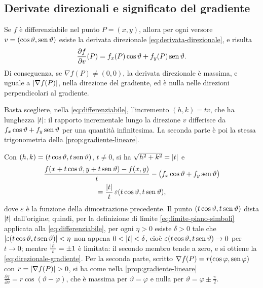 \subsection{Derivate direzionali e significato del gradiente}

\begin{teorema}\label{teo:derivata-direzionale}
Se $f$ è differenziabile nel punto $P=(x,y)$, allora per ogni versore
$v=(\cos\vartheta,\operatorname{sen}\vartheta)$ esiste la derivata direzionale \eqref{eq:derivata-direzionale},
e risulta
\begin{equation}\label{eq:direzionale-gradiente}
  \frac{\partial f}{\partial v}(P)=f_{x}(P)\cos\vartheta+f_{y}(P)\operatorname{sen}\vartheta .
\end{equation}
Di conseguenza, se $\nabla f(P)\neq(0,0)$, la derivata direzionale è massima, e uguale a
$\lvert \nabla f(P)\rvert$, nella direzione del gradiente, ed è nulla nelle direzioni
perpendicolari al gradiente.
\end{teorema}

\begin{schema}
\end{schema}

\begin{strategia}
Basta scegliere, nella \eqref{eq:differenziabile}, l'incremento $(h,k)=tv$, che ha
lunghezza $\lvert t\rvert$: il rapporto incrementale lungo la direzione $v$ differisce da
$f_{x}\cos\vartheta+f_{y}\operatorname{sen}\vartheta$ per una quantità infinitesima. La seconda parte è poi
la stessa trigonometria della \cref{prop:gradiente-lineare}.
\end{strategia}

\begin{dimostrazione}
Con $(h,k)=(t\cos\vartheta,t\operatorname{sen}\vartheta)$, $t\neq0$, si ha $\sqrt{h^{2}+k^{2}}=\lvert t\rvert$ e
\begin{multline*}
  \frac{f(x+t\cos\vartheta,y+t\operatorname{sen}\vartheta)-f(x,y)}{t}-\bigl(f_{x}\cos\vartheta+f_{y}\operatorname{sen}\vartheta\bigr)\\
  =\frac{\lvert t\rvert}{t}\,\varepsilon(t\cos\vartheta,t\operatorname{sen}\vartheta),
\end{multline*}
dove $\varepsilon$ è la funzione della dimostrazione precedente. Il punto
$(t\cos\vartheta,t\operatorname{sen}\vartheta)$ dista $\lvert t\rvert$ dall'origine; quindi, per la definizione di
limite \eqref{eq:limite-piano-simboli} applicata alla \eqref{eq:differenziabile}, per ogni
$\eta>0$ esiste $\delta>0$ tale che $\lvert \varepsilon(t\cos\vartheta,t\operatorname{sen}\vartheta)\rvert<\eta$ non appena
$0<\lvert t\rvert<\delta$, cioè $\varepsilon(t\cos\vartheta,t\operatorname{sen}\vartheta)\to0$ per $t\to0$; mentre $\frac{\lvert t\rvert}t=\pm1$ è limitata: il secondo membro tende a zero, e si ottiene la
\eqref{eq:direzionale-gradiente}. Per la seconda parte, scritto
$\nabla f(P)=r(\cos\varphi,\operatorname{sen}\varphi)$ con $r=\lvert \nabla f(P)\rvert>0$, si ha come nella
\cref{prop:gradiente-lineare} $\frac{\partial f}{\partial v}=r\cos(\vartheta-\varphi)$, che è
massima per $\vartheta=\varphi$ e nulla per $\vartheta=\varphi\pm\frac\pi2$.
\end{dimostrazione}

